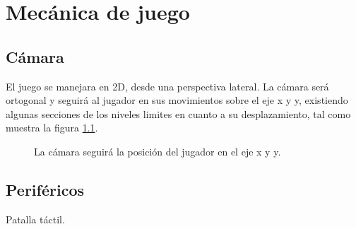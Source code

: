\chapter{Mecánica de juego}
	\section{Cámara}
El juego se manejara en 2D, desde una perspectiva lateral. La cámara será ortogonal y seguirá al jugador en sus movimientos sobre el eje x y y, existiendo algunas secciones de los niveles limites en cuanto a su desplazamiento, tal como muestra la figura \ref{fig:Camara}. 

\begin{figure}
  \centering
  \caption{La cámara seguirá la posición del jugador en el eje x y y.}
  \label{fig:Camara}
\end{figure} 
	\section{Periféricos}
	Patalla táctil.
